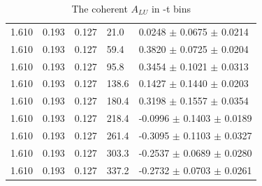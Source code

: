 \begin{table}[!h]
\begin{center}
\begin{tabular}{||l|l|l|l|l||}
  1.610 & 0.193 & 0.127 & 21.0   &  0.0248   $\pm$ 0.0675    $\pm$  0.0214  \\
  1.610 & 0.193 & 0.127 & 59.4   &  0.3820   $\pm$ 0.0725    $\pm$  0.0204  \\
  1.610 & 0.193 & 0.127 & 95.8   &  0.3454   $\pm$ 0.1021    $\pm$  0.0313  \\
  1.610 & 0.193 & 0.127 & 138.6  &  0.1427   $\pm$ 0.1440    $\pm$  0.0203  \\
  1.610 & 0.193 & 0.127 & 180.4  &  0.3198   $\pm$ 0.1557    $\pm$  0.0354  \\
  1.610 & 0.193 & 0.127 & 218.4  & -0.0996   $\pm$ 0.1403    $\pm$  0.0189  \\
  1.610 & 0.193 & 0.127 & 261.4  & -0.3095   $\pm$ 0.1103    $\pm$  0.0327  \\
  1.610 & 0.193 & 0.127 & 303.3  & -0.2537   $\pm$ 0.0689    $\pm$  0.0280  \\
  1.610 & 0.193 & 0.127 & 337.2  & -0.2732   $\pm$ 0.0703    $\pm$  0.0261  \\
         
         \hline
         \hline
      \end{tabular}
      \caption{The coherent $A_{LU}$ in -t bins}
      \label{table:Coh_t_BSA}
   \end{center}
\end{table}


